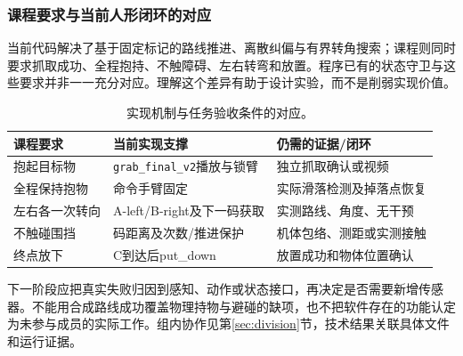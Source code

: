 \subsubsection{课程要求与当前人形闭环的对应}
当前代码解决了基于固定标记的路线推进、离散纠偏与有界转角搜索；课程则同时要求抓取成功、全程抱持、不触障碍、左右转弯和放置。程序已有的状态守卫与这些要求并非一一充分对应。理解这个差异有助于设计实验，而不是削弱实现价值。
\begin{table}[H]\centering\small\begin{tabularx}{\linewidth}{p{25mm}YY}\toprule 课程要求 & 当前实现支撑 & 仍需的证据/闭环\\\midrule
抱起目标物 & \texttt{grab\_\allowbreak final\_\allowbreak v2}播放与锁臂 & 独立抓取确认或视频\\
全程保持抱物 & 命令手臂固定 & 实际滑落检测及掉落点恢复\\
左右各一次转向 & A-left/B-right及下一码获取 & 实测路线、角度、无干预\\
不触碰围挡 & 码距离及次数/推进保护 & 机体包络、测距或实测接触\\
终点放下 & C到达后put\_down & 放置成功和物体位置确认\\\bottomrule\end{tabularx}\caption{实现机制与任务验收条件的对应。}\end{table}
下一阶段应把真实失败归因到感知、动作或状态接口，再决定是否需要新增传感器。不能用合成路线成功覆盖物理持物与避碰的缺项，也不把软件存在的功能认定为未参与成员的实际工作。组内协作见第\ref{sec:division}节，技术结果关联具体文件和运行证据。

